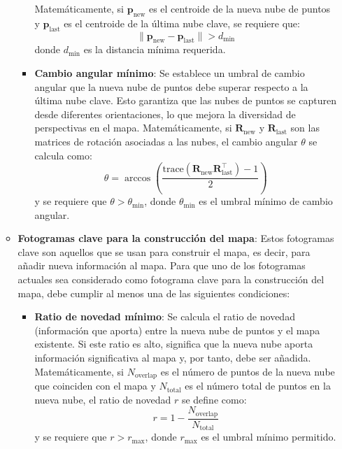 \documentclass[12pt, a4paper, twoside]{article}
\begin{document}
\begin{itemize}
\begin{itemize}
\begin{itemize}
      Matemáticamente, si $\mathbf{p}_{\text{new}}$ es el centroide de la nueva nube de puntos y $\mathbf{p}_{\text{last}}$ es el centroide de la última nube clave, se requiere que:
      \[
      \|\mathbf{p}_{\text{new}} - \mathbf{p}_{\text{last}}\| > d_{\text{min}}
      \]
      donde $d_{\text{min}}$ es la distancia mínima requerida.
      \item \textbf{Cambio angular mínimo}: Se establece un umbral de cambio angular que la nueva nube de puntos debe superar respecto a la última nube clave. Esto garantiza que las 
      nubes de puntos se capturen desde diferentes orientaciones, lo que mejora la diversidad de perspectivas en el mapa.
      Matemáticamente, si $\mathbf{R}_{\text{new}}$ y $\mathbf{R}_{\text{last}}$ son las matrices de rotación asociadas a las nubes, el cambio angular $\theta$ se calcula como:
      \[
      \theta = \arccos\left(\frac{\text{trace}(\mathbf{R}_{\text{new}} \mathbf{R}_{\text{last}}^\top) - 1}{2}\right)
      \]
      y se requiere que $\theta > \theta_{\text{min}}$, donde $\theta_{\text{min}}$ es el umbral mínimo de cambio angular.
    \end{itemize}
    \item \textbf{Fotogramas clave para la construcción del mapa}: Estos fotogramas clave son aquellos que se usan para construir el mapa, es decir, para añadir nueva información
    al mapa. Para que uno de los fotogramas actuales sea considerado como fotograma clave para la construcción del mapa, debe cumplir al menos una de las siguientes condiciones:
    \begin{itemize}
      \item \textbf{Ratio de novedad mínimo}: Se calcula el ratio de novedad (información que aporta) entre la nueva nube de puntos y el mapa existente. Si este ratio es alto, 
      significa que la nueva nube aporta información significativa al mapa y, por tanto, debe ser añadida.
      Matemáticamente, si $N_{\text{overlap}}$ es el número de puntos de la nueva nube que coinciden con el mapa y $N_{\text{total}}$ es el número total de puntos en la nueva nube, el ratio de novedad $r$ se define como:
      \[
      r = 1-\frac{N_{\text{overlap}}}{N_{\text{total}}}
      \]
      y se requiere que $r > r_{\text{max}}$, donde $r_{\text{max}}$ es el umbral mínimo permitido.
    \end{itemize}
  \end{itemize}
\end{itemize}
\end{document}
